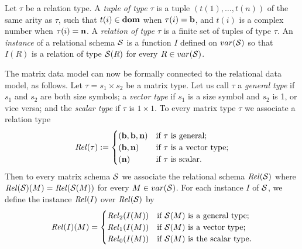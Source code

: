 Let $\tau$ be a relation type. A \emph{tuple
of type $\tau$} is a tuple $(t(1),\dots,t(n))$ of the same arity
as $\tau$, such that $t(i) \in \mathbf{dom}$ when $\tau(i) = \mathbf{b}$, and
$t(i)$ is a complex number when $\tau(i) = \mathbf{n}$.
A \emph{relation of type
$\tau$} is a finite set of tuples of type $\tau$.  
An \emph{instance} of a relational schema $\mathcal{S}$ is a
function $I$ defined on $var(\mathcal{S})$ so that $I(R)$ is a relation
of type $\mathcal{S}(R)$ for every $R \in var(\mathcal{S})$.

The matrix data model can now be formally connected to the relational data
model, as follows. Let $\tau = s_1\times s_2$ be a matrix type.  Let us call $\tau$ a
\emph{general type} if $s_1$ and $s_2$ are both size symbols; a
\emph{vector type} if $s_1$ is a size symbol and $s_2$ is 1, or
vice versa; and the \emph{scalar type} if $\tau$ is $1\times 1$.
To every matrix type $\tau$ we associate a relation type
$$ \mathit{Rel}(\tau) := \begin{cases}
(\mathbf{b},\mathbf{b},\mathbf{n}) & \text{if $\tau$ is general;} \\
(\mathbf{b},\mathbf{n}) & \text{if $\tau$ is a vector type;} \\
(\mathbf{n}) & \text{if $\tau$ is scalar.} \end{cases} $$
Then to every matrix schema $\mathcal{S}$ we associate the relational
schema $\mathit{Rel}(\mathcal{S})$ where $\mathit{Rel}(\mathcal{S})(M) = \mathit{Rel}(\mathcal{S}(M))$ for
every $M \in var(\mathcal{S})$.  For each instance $I$ of
$\mathcal{S}$, we define the instance $\mathit{Rel}(I)$ over
$\mathit{Rel}(\mathcal{S})$ by $$ \mathit{Rel}(I)(M) = \begin{cases} 
\mathit{Rel}_2(I(M)) & \text{if $\mathcal{S}(M)$ is a general type;} \\
\mathit{Rel}_1(I(M)) & \text{if $\mathcal{S}(M)$ is a vector type;} \\
\mathit{Rel}_0(I(M)) & \text{if $\mathcal{S}(M)$ is the scalar type.}
\end{cases} $$  

